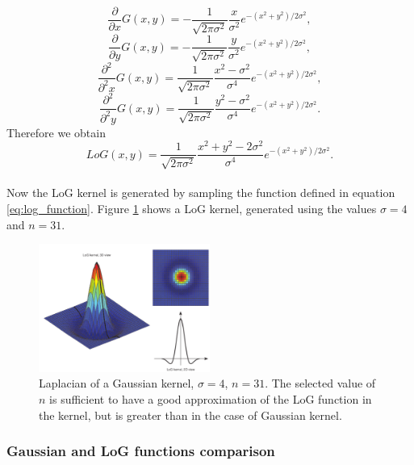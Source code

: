 \documentclass{ipol}
\numberwithin{equation}{section}
\numberwithin{table}{section}
\begin{document}
{\begin{equation} 
	\frac{\partial}{\partial x}G(x,y)=-\frac{1}{\sqrt{2\pi\sigma^2}}\frac{x}{\sigma^2}e^{-(x^2+y^2)/2\sigma^2},
\end{equation}
\begin{equation} 
	\frac{\partial}{\partial y}G(x,y)=-\frac{1}{\sqrt{2\pi\sigma^2}}\frac{y}{\sigma^2}e^{-(x^2+y^2)/2\sigma^2},
\end{equation}
\begin{equation} 
	\frac{\partial^2}{\partial^2 x}G(x,y)=\frac{1}{\sqrt{2\pi\sigma^2}}\frac{x^2-\sigma^2}{\sigma^4}e^{-(x^2+y^2)/2\sigma^2},
\end{equation}
\begin{equation} 
	\frac{\partial^2}{\partial^2 y}G(x,y)=\frac{1}{\sqrt{2\pi\sigma^2}}\frac{y^2-\sigma^2}{\sigma^4}e^{-(x^2+y^2)/2\sigma^2}.
\end{equation}
Therefore we obtain
\begin{equation}
	\label{eq:log_function}
	LoG(x,y)=\frac{1}{\sqrt{2\pi\sigma^2}}\frac{x^2+y^2-2\sigma^2}{\sigma^4}e^{-(x^2+y^2)/2\sigma^2}.
\end{equation}\\

Now the LoG kernel is generated by sampling the function defined in equation \ref{eq:log_function}. 
Figure \ref{fig:log_kernel} shows a LoG kernel, generated using the values $\sigma=4$ and $n=31$.

\begin{figure}
	\centering
	\includegraphics[width=0.5\textwidth]{kernel_log.pdf}
	\caption{Laplacian of a Gaussian kernel, $\sigma=4$, $n=31$. The selected value of $n$ is sufficient 
to have a good approximation of the LoG function in the kernel, but is greater than in the case of 
Gaussian kernel.}
	\label{fig:log_kernel}
\end{figure}


\subsubsection{Gaussian and LoG functions comparison}
\label{kernelcomparison}

}
\end{document}
